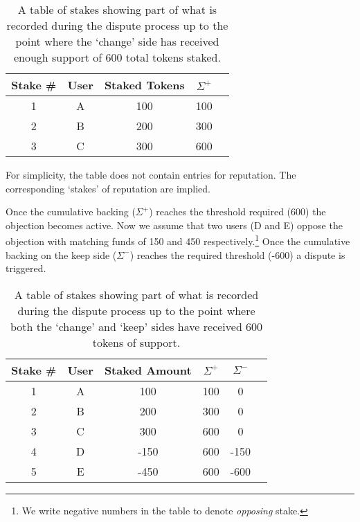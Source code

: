 \begin{table}[h]
\centering
\caption{A table of stakes showing part of what is recorded during the dispute process up to the point where the `change' side has received enough support of 600 total tokens staked.}
\begin{tabular}{|c|c|c|c|c|}
\hline
\textbf{Stake \#} & \textbf{User}  & \textbf{Staked Tokens} & \textbf{$\Sigma^+$} \\ \hline
1 & A & 100           & 100                                                                                          \\ \hline
2 & B & 200           & 300                                                                                           \\ \hline
3 & C & 300           & 600                                                                                           \\ \hline
\end{tabular}
\end{table}
For simplicity, the table does not contain entries for reputation. The corresponding `stakes' of reputation are implied.

Once the cumulative backing ($\Sigma^+$) reaches the threshold required (600) the objection becomes active. Now we assume that two users (D and E) oppose the objection with matching funds of 150 and 450 respectively.\footnote{We write negative numbers in the table to denote \emph{opposing} stake.} Once the cumulative backing on the keep side ($\Sigma^-$) reaches the required threshold (-600) a dispute is triggered.

\begin{table}[h]
\centering
\caption{A table of stakes showing part of what is recorded during the dispute process up to the point where both the `change' and `keep' sides have received 600 tokens of support.}
\begin{tabular}{|c|c|c|c|c|c|}
\hline
Stake \# & User  & Staked Amount & $\Sigma^+$ & $\Sigma^-$ \\ \hline
1 & A & 100           & 100                      & 0                                                                       \\ \hline
2 & B & 200           & 300                      & 0                                                                       \\ \hline
3 & C & 300           & 600                      & 0                                                                       \\ \hline
4 & D & -150          & 600                      & -150                                                                    \\ \hline
5 & E & -450          & 600                      & -600                                                                    \\ \hline
\end{tabular}
\end{table}

